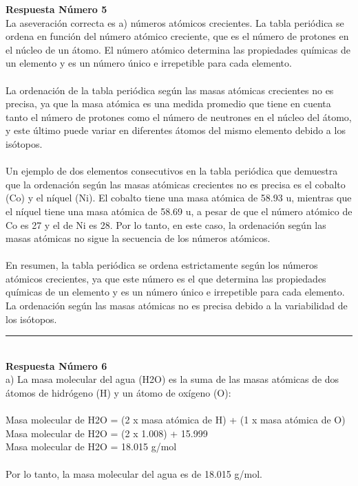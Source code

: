 \documentclass{article}
\begin{document}
\textbf{Respuesta Número 5} \\
La aseveración correcta es a) números atómicos crecientes. La tabla periódica se ordena en función del número atómico creciente, que es el número de protones en el núcleo de un átomo. El número atómico determina las propiedades químicas de un elemento y es un número único e irrepetible para cada elemento.\\
\\
La ordenación de la tabla periódica según las masas atómicas crecientes no es precisa, ya que la masa atómica es una medida promedio que tiene en cuenta tanto el número de protones como el número de neutrones en el núcleo del átomo, y este último puede variar en diferentes átomos del mismo elemento debido a los isótopos.\\
\\
Un ejemplo de dos elementos consecutivos en la tabla periódica que demuestra que la ordenación según las masas atómicas crecientes no es precisa es el cobalto (Co) y el níquel (Ni). El cobalto tiene una masa atómica de 58.93 u, mientras que el níquel tiene una masa atómica de 58.69 u, a pesar de que el número atómico de Co es 27 y el de Ni es 28. Por lo tanto, en este caso, la ordenación según las masas atómicas no sigue la secuencia de los números atómicos.\\
\\
En resumen, la tabla periódica se ordena estrictamente según los números atómicos crecientes, ya que este número es el que determina las propiedades químicas de un elemento y es un número único e irrepetible para cada elemento. La ordenación según las masas atómicas no es precisa debido a la variabilidad de los isótopos.\\
\noindent\rule{\textwidth}{1pt} \\
\textbf{Respuesta Número 6} \\
a) La masa molecular del agua (H2O) es la suma de las masas atómicas de dos átomos de hidrógeno (H) y un átomo de oxígeno (O):\\
\\
Masa molecular de H2O = (2 x masa atómica de H) + (1 x masa atómica de O)\\
Masa molecular de H2O = (2 x 1.008) + 15.999\\
Masa molecular de H2O = 18.015 g/mol\\
\\
Por lo tanto, la masa molecular del agua es de 18.015 g/mol.\\
\\
\end{document}
